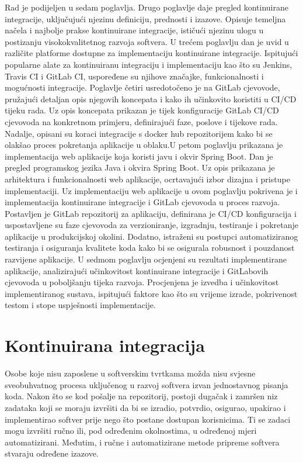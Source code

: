 \documentclass[a4paper,12pt,oneside]{article}
\begin{document}
Rad je podijeljen u sedam poglavlja. Drugo poglavlje daje pregled kontinuirane integracije, uključujući njezinu definiciju, prednosti i izazove. Opisuje temeljna načela i najbolje prakse kontinuirane integracije, ističući njezinu ulogu u postizanju visokokvalitetnog razvoja softvera. U trećem poglavlju dan je uvid u različite platforme dostupne za implementaciju kontinuirane integracije. Ispitujući popularne alate za kontinuiranu integraciju i implementaciju kao što su Jenkins, Travis CI i GitLab CI, uspoređene su njihove značajke, funkcionalnosti i mogućnosti integracije. Poglavlje četiri usredotočeno je na GitLab cjevovode, pružajući detaljan opis njegovih koncepata i kako ih učinkovito koristiti u CI/CD tijeku rada. Uz opis koncepata prikazan je tijek konfiguracije GitLab CI/CD cjevovoda na konkretnom primjeru, definirajući faze, poslove i tijekove rada. Nadalje, opisani su koraci integracije s docker hub repozitorijem kako bi se olakšao proces pokretanja aplikacije u oblaku.U petom poglavlju prikazana je implementacija web aplikacije koja koristi javu i okvir Spring Boot. Dan je pregled programskog jezika Java i okvira Spring Boot. Uz opis prikazana je arhitektura i funkcionalnosti web aplikacije, ocrtavajući izbor dizajna i pristupe implementaciji. Uz implementaciju web aplikacije u ovom poglavlju pokrivena je i implementacija kontinuirane integracije i GitLab cjevovoda u proces razvoja. Postavljen je GitLab repozitorij za aplikaciju, definirana je CI/CD konfiguracija i uspostavljene su faze cjevovoda za verzioniranje, izgradnju, testiranje i pokretanje aplikacije u produkcijskoj okolini. Dodatno, istraženi su postupci automatiziranog testiranja i osiguranja kvalitete koda kako bi se osigurala robusnost i pouzdanost razvijene aplikacije. U sedmom poglavlju ocjenjeni su rezultati implementirane aplikacije, analizirajući učinkovitost kontinuirane integracije i GitLabovih cjevovoda u poboljšanju tijeka razvoja. Procjenjena je  izvedba i učinkovitost implementiranog sustava, ispitujući faktore kao što su vrijeme izrade, pokrivenost testom i stope uspješnosti implementacije.


\newpage

\section{Kontinuirana integracija}
Osobe koje nisu zaposlene u softverskim tvrtkama možda nisu svjesne sveobuhvatnog procesa uključenog u razvoj softvera izvan jednostavnog pisanja koda. Nakon što se kod pošalje na repozitorij, postoji dugačak i zamršen niz zadataka koji se moraju izvršiti da bi se izradio, potvrdio, osigurao, upakirao i implementirao softver prije nego što postane dostupan korisnicima. Ti se zadaci mogu izvršiti ručno ili, pod određenim okolnostima, u određenoj mjeri automatizirani. Međutim, i ručne i automatizirane metode pripreme softvera stvaraju određene izazove.
\end{document}
